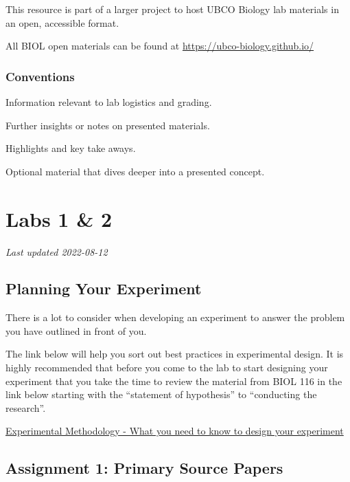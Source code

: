 \documentclass[
]{book}
\begin{document}
This resource is part of a larger project to host UBCO Biology lab materials in an open, accessible format.

All BIOL open materials can be found at \url{https://ubco-biology.github.io/}

\hypertarget{conventions}{%
\section*{Conventions}\label{conventions}}

Information relevant to lab logistics and grading.

Further insights or notes on presented materials.

Highlights and key take aways.

Optional material that dives deeper into a presented concept.

\hypertarget{part-labs-1-2}{%
\part*{Labs 1 \& 2}\label{part-labs-1-2}}

\emph{Last updated 2022-08-12}

\hypertarget{planning-your-experiment}{%
\chapter*{Planning Your Experiment}\label{planning-your-experiment}}

There is a lot to consider when developing an experiment to answer the problem you have outlined in front of you.

The link below will help you sort out best practices in experimental design. It is highly recommended that before you come to the lab to start designing your experiment that you take the time to review the material from BIOL 116 in the link below starting with the ``statement of hypothesis'' to ``conducting the research''.

\href{https://ubco-biology.github.io/BIOL-116-Lab-Manual/statement-of-hypothesis.html}{Experimental Methodology - What you need to know to design your experiment}

\hypertarget{assignment-1-primary-source-papers}{%
\chapter*{Assignment 1: Primary Source Papers}\label{assignment-1-primary-source-papers}}
\end{document}
